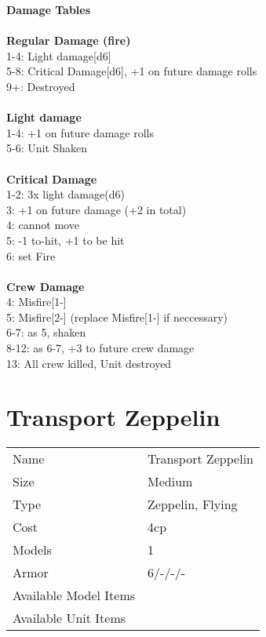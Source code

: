 {\bf Damage Tables} \\
\ \\ {\bf Regular Damage (fire) } \\
1-4: Light damage[d6] \\
5-8: Critical Damage[d6], +1 on future damage rolls \\
9+: Destroyed \\
\ \\ {\bf Light damage } \\
1-4: +1 on future damage rolls \\
5-6: Unit Shaken \\
\ \\ {\bf Critical Damage } \\
1-2: 3x light damage(d6) \\
3: +1 on future damage (+2 in total) \\
4: cannot move \\
5: -1 to-hit, +1 to be hit \\
6: set Fire \\
\ \\ {\bf Crew Damage } \\
4: Misfire[1-] \\
5: Misfire[2-] (replace Misfire[1-] if neccessary) \\
6-7: as 5, shaken \\
8-12: as 6-7, +3 to future crew damage \\
13: All crew killed, Unit destroyed \\









\pagebreak

\section{ Transport Zeppelin }

\begin{tabular}{ll}
  Name & Transport Zeppelin \\
  Size & Medium\\
  Type & Zeppelin, Flying\\
  Cost & 4cp\\
  Models & 1\\
  Armor & 6/-/-/-\\
  Available Model Items &  \\
  Available Unit Items &  \\
\end{tabular}

